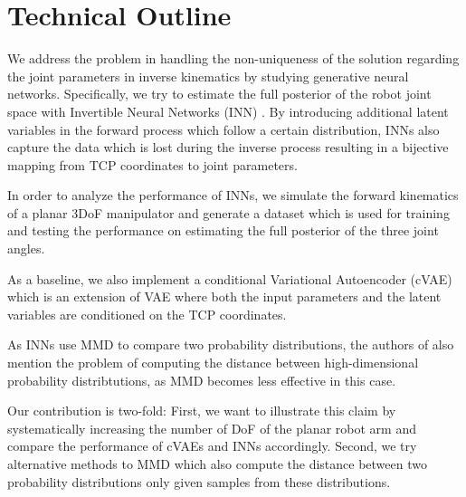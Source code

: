 \documentclass[12pt]{extarticle}
\begin{document}
\section*{Technical Outline}

We address the problem in handling the non-uniqueness of the solution regarding the joint parameters in inverse kinematics by studying generative neural networks. Specifically, we try to estimate the full posterior of the robot joint space with Invertible Neural Networks (INN) \cite{Ardizzone2018}. By introducing additional latent variables in the forward process which follow a certain distribution, INNs also capture the data which is lost during the inverse process resulting in a bijective mapping from TCP coordinates to joint parameters.

In order to analyze the performance of INNs, we simulate the forward kinematics of a planar 3DoF manipulator and generate a dataset which is used for training and testing the performance on estimating the full posterior of the three joint angles.

As a baseline, we also implement a conditional Variational Autoencoder (cVAE) \cite{Sohn2015} which is an extension of VAE where both the input parameters and the latent variables are conditioned on the TCP coordinates.

As INNs use MMD to compare two probability distributions, the authors of \cite{Ardizzone2018} also mention the problem of computing the distance between high-dimensional probability distribtutions, as MMD becomes less effective in this case.

Our contribution is two-fold: First, we want to illustrate this claim by systematically increasing the number of DoF of the planar robot arm and compare the performance of cVAEs and INNs accordingly. Second, we try alternative methods to MMD which also compute the distance between two probability distributions only given samples from these distributions.



\end{document}
